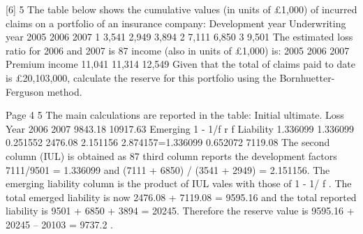 \documentclass[a4paper,12pt]{article}
\begin{document}
[6]
5 The table below shows the cumulative values (in units of £1,000) of incurred claims
on a portfolio of an insurance company:
Development year
Underwriting
year
2005
2006
2007
1
3,541
2,949
3,894
2
7,111
6,850
3
9,501
The estimated loss ratio for 2006 and 2007 is 87%
income (also in units of £1,000) is:
2005
2006
2007
Premium income
11,041
11,314
12,549
Given that the total of claims paid to date is £20,103,000, calculate the reserve for this
portfolio using the Bornhuetter-Ferguson method.


Page 4%
5
The main calculations are reported in the table:
Initial ultimate.
Loss
Year
2006
2007
9843.18
10917.63
Emerging
1 - 1/f
r
f
Liability
1.336099 1.336099
0.251552 2476.08
2.151156 2.874157=1.336099 0.652072 7119.08
The second column (IUL) is obtained as 87%
third column reports the development factors
7111/9501 = 1.336099 and (7111 + 6850) / (3541 + 2949) = 2.151156.
The emerging liability column is the product of IUL vales with those of
1 - 1/ f .
The total emerged liability is now 2476.08 + 7119.08 = 9595.16 and the total
reported liability is 9501 + 6850 + 3894 = 20245. Therefore the reserve value
is 9595.16 + 20245 – 20103 = 9737.2 .
\end{document}
